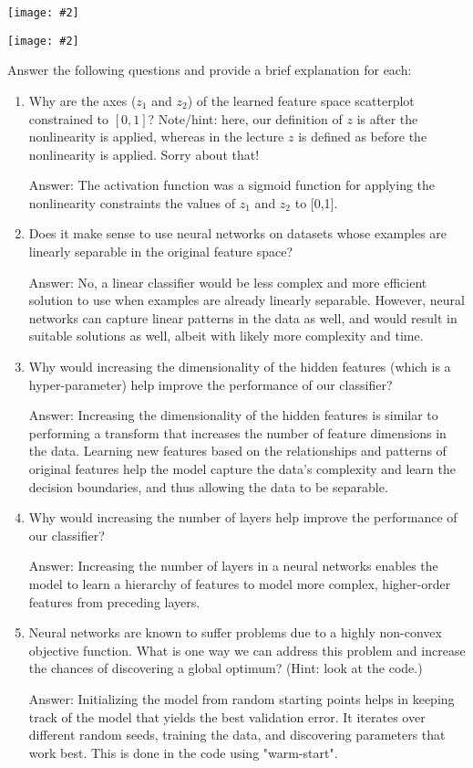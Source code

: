 \documentclass{article}
\newcommand{\blu}[1]{{\textcolor{blu}{#1}}}
\newcommand{\gre}[1]{\textcolor{gre}{#1}}
\newcommand\ans[1]{\par\gre{Answer: #1}}
\let\ask\blu
\newcommand{\centerfig}[2]{\begin{center}\texttt{[image: \#2]}\end{center}}
\begin{document}
\centerfig{.7}{./figs/sinusoids_decision_boundary_[2, 2]_2.png}
\centerfig{.7}{./figs/sinusoids_linear_boundary_[2, 2]_2.png}

\ask{Answer the following questions and provide a brief explanation for each:}

\begin{enumerate}
	\item Why are the axes ($z_1$ and $z_2$) of the learned feature space scatterplot constrained to $[0, 1]$? Note/hint: here, our definition of $z$ is after the nonlinearity is applied, whereas in the lecture $z$ is defined as before the nonlinearity is applied. Sorry about that!
    \ans{The activation function was a sigmoid function for applying the nonlinearity constraints the values of $z_1$ and $z_2$ to [0,1].}
	\item Does it make sense to use neural networks on datasets whose examples are linearly separable in the original feature space?
    \ans{No, a linear classifier would be less complex and more efficient solution to use when examples are already linearly separable. However, neural networks can capture linear patterns in the data as well, and would result in suitable solutions as well, albeit with likely more complexity and time.}
	\item Why would increasing the dimensionality of the hidden features (which is a hyper-parameter) help improve the performance of our classifier?
    \ans{Increasing the dimensionality of the hidden features is similar to performing a transform that increases the number of feature dimensions in the data. Learning new features based on the relationships and patterns of original features help the model capture the data's complexity and learn the decision boundaries, and thus allowing the data to be separable.}
	\item Why would increasing the number of layers help improve the performance of our classifier?
    \ans{Increasing the number of layers in a neural networks enables the model to learn a hierarchy of features to model more complex, higher-order features from preceding layers.}
	\item Neural networks are known to suffer problems due to a highly non-convex objective function. What is one way we can address this problem and increase the chances of discovering a global optimum? (Hint: look at the code.)
    \ans{Initializing the model from random starting points helps in keeping track of the model that yields the best validation error. It iterates over different random seeds, training the data, and discovering parameters that work best. This is done in the code using "warm-start".}
\end{enumerate}
\newpage
\end{document}
